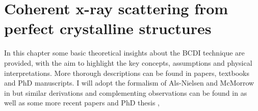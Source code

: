 



\section{Coherent x-ray scattering from perfect crystalline structures}

In this chapter some basic theoretical insights about the BCDI technique are provided, with the aim to highlight the key 
concepts, assumptions and physical interpretations. More thorough descriptions can be found in papers, textbooks 
and PhD manuscripts. I will adopt the formalism of Als-Nielsen and McMorrow in \cite{alsnielsen_mcmorrow2011} but similar 
derivations and complementing observations can be found in \cite{guinier1994, paganin2006coherent} as well as some more recent papers \cite{vartanyants2013coherentxraydiffractionimaging} 
and PhD thesis \cite{dupraz:tel-01285735, girard:tel-02906931}
, 

